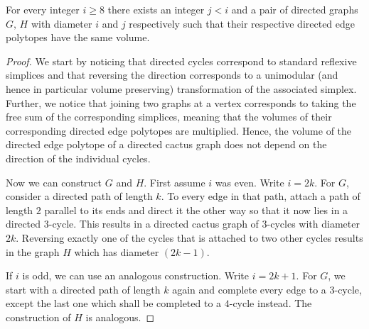 \documentclass[10pt,a4paper]{amsart}
\begin{document}
\begin{theorem}
    For every integer $i\geq 8$ there exists an integer $j<i$ and a pair of directed graphs $G, \, H$ with diameter $i$ and $j$ respectively such that their respective directed edge polytopes have the same volume.
\end{theorem}

\begin{proof}
    We start by noticing that directed cycles correspond to standard reflexive simplices and that reversing the direction corresponds to a unimodular (and hence in particular volume preserving) transformation of the associated simplex.
    Further, we notice that joining two graphs at a vertex corresponds to taking the free sum of the corresponding simplices, meaning that the volumes of their corresponding directed edge polytopes are multiplied.
    Hence, the volume of the directed edge polytope of a directed cactus graph does not depend on the direction of the individual cycles.

    Now we can construct $G$ and $H$.
    First assume $i$ was even.
    Write $i=2k$.
    For $G$, consider a directed path of length $k$.
    To every edge in that path, attach a path of length $2$ parallel to its ends and direct it the other way so that it now lies in a directed $3$-cycle.
    This results in a directed cactus graph of $3$-cycles with diameter $2k$.
    Reversing exactly one of the cycles that is attached to two other cycles results in the graph $H$ which has diameter $(2k-1)$.

    If $i$ is odd, we can use an analogous construction.
    Write $i=2k+1$.
    For $G$, we start with a directed path of length $k$ again and complete every edge to a $3$-cycle, except the last one which shall be completed to a $4$-cycle instead.
    The construction of $H$ is analogous.
\end{proof}
\end{document}
